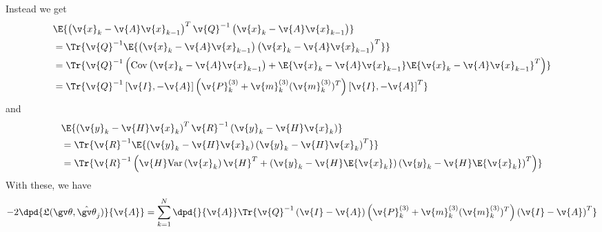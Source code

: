 Instead we get
\begin{align}
\begin{split}
&\E{\left(\v{x}_k-\v{A}\v{x}_{k-1}\right)^T\v{Q}^{-1}\left(\v{x}_k-\v{A}\v{x}_{k-1}\right)}\\
&=\Tr{\v{Q}^{-1}\E{\left(\v{x}_k-\v{A}\v{x}_{k-1}\right)\left(\v{x}_k-\v{A}\v{x}_{k-1}\right)^T}}\\
&=\Tr{\v{Q}^{-1}\left(\mathrm{Cov}\left(\v{x}_k-\v{A}\v{x}_{k-1}\right)+\E{\v{x}_k-\v{A}\v{x}_{k-1}}\E{\v{x}_k-\v{A}\v{x}_{k-1}}^T\right)}\\
&=\Tr{\v{Q}^{-1}\left[\v{I},-\v{A}\right]\left(\v{P}_{k}^{(3)}+\v{m}_{k}^{(3)}(\v{m}_{k}^{(3)})^T\right)\left[\v{I},-\v{A}\right]^T} 
\end{split}
\end{align}
and
\begin{align}
\begin{split}
&\E{\left(\v{y}_k-\v{H}\v{x}_{k}\right)^T\v{R}^{-1}\left(\v{y}_k-\v{H}\v{x}_{k}\right)}\\
&=\Tr{\v{R}^{-1}\E{\left(\v{y}_k-\v{H}\v{x}_{k}\right)\left(\v{y}_k-\v{H}\v{x}_{k}\right)^T}}\\
&=\Tr{\v{R}^{-1}\left(\v{H}\mathrm{Var}\left(\v{x}_{k}\right)\v{H}^T+\left(\v{y}_k-\v{H}\E{\v{x}_{k}}\right)\left(\v{y}_k-\v{H}\E{\v{x}_{k}}\right)^T\right)}
\end{split}
\end{align}
With these, we have
\begin{multline}
	-2\dpd{\Lb(\Th,\hat{\Th}_j)}{\v{A}}=
	\sum_{k=1}^N\dpd{}{\v{A}}\Tr{\v{Q}^{-1}\left(\v{I}-\v{A}\right)\left(\v{P}_{k}^{(3)}+\v{m}_{k}^{(3)}(\v{m}_{k}^{(3)})^T\right)\left(\v{I}-\v{A}\right)^T}
	\label{eq:clLH_pdA}
\end{multline}

